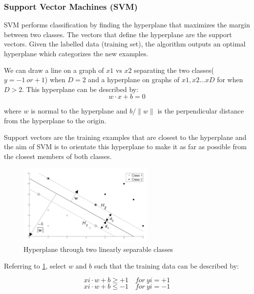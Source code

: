 \documentclass[letterpaper,10pt]{article}
\theoremstyle{mytheor}
\begin{document}
\subsubsection{Support Vector Machines (SVM)}

SVM performs classification by finding the hyperplane that maximizes the margin between two classes. The vectors that define the hyperplane are the support vectors. Given the labelled data (training set), the algorithm outputs an optimal hyperplane which categorizes the new examples.

We can draw a line on a graph of $x1$ vs $x2$ separating the two classes($y = -1\  or +1$) when $D = 2$ and a hyperplane on graphs of $x1, x2 ...xD$ for when $D > 2$.  This hyperplane can be described by:
\begin{equation}
w \cdot x + b = 0
\end{equation}

where $w$ is normal to the hyperplane and $b/\|w\|$ is the perpendicular distance from the hyperplane to the origin.

Support vectors are the training examples that are closest to the hyperplane and the aim of SVM is to orientate this hyperplane to make it as far as possible from the closest members of both classes.

\begin{figure}[H]
\includegraphics[width=0.6\textwidth]{svm}
\centering
\caption{Hyperplane through two linearly separable classes}
\label{fig:2}
\end{figure}

Referring to \ref{fig:2}, select $w$ and $b$ such that the training data can be described by:

\begin{equation}
xi \cdot w + b \geq  +1 \quad for\ yi = +1
\end{equation}
\begin{equation}
xi \cdot w + b \leq -1 \quad for\ yi = -1
\end{equation}
\end{document}
